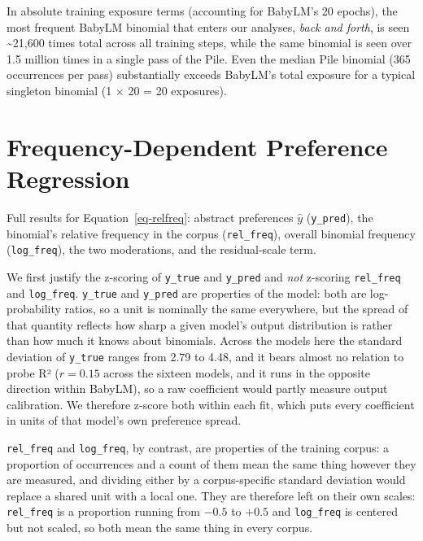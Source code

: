 \documentclass[11pt]{article}
\begin{document}
In absolute training exposure terms (accounting for BabyLM's 20 epochs),
the most frequent BabyLM binomial that enters our analyses, \emph{back
and forth}, is seen \textasciitilde21,600 times total across all
training steps, while the same binomial is seen over 1.5 million times
in a single pass of the Pile. Even the median Pile binomial (365
occurrences per pass) substantially exceeds BabyLM's total exposure for
a typical singleton binomial (1 × 20 = 20 exposures).

\newpage

\section{Frequency-Dependent Preference
Regression}\label{sec-appendix-relfreq}

Full results for Equation~\ref{eq-relfreq}: abstract preferences
\(\hat{y}\) (\texttt{y\_pred}), the binomial's relative frequency in the
corpus (\texttt{rel\_freq}), overall binomial frequency
(\texttt{log\_freq}), the two moderations, and the residual-scale term.

We first justify the z-scoring of \texttt{y\_true} and \texttt{y\_pred}
and \emph{not} z-scoring \texttt{rel\_freq} and \texttt{log\_freq}.
\texttt{y\_true} and \texttt{y\_pred} are properties of the model: both
are log-probability ratios, so a unit is nominally the same everywhere,
but the spread of that quantity reflects how sharp a given model's
output distribution is rather than how much it knows about binomials.
Across the models here the standard deviation of \texttt{y\_true} ranges
from 2.79 to 4.48, and it bears almost no relation to probe R²
(\(r = 0.15\) across the sixteen models, and it runs in the opposite
direction within BabyLM), so a raw coefficient would partly measure
output calibration. We therefore z-score both within each fit, which
puts every coefficient in units of that model's own preference spread.

\texttt{rel\_freq} and \texttt{log\_freq}, by contrast, are properties
of the training corpus: a proportion of occurrences and a count of them
mean the same thing however they are measured, and dividing either by a
corpus-specific standard deviation would replace a shared unit with a
local one. They are therefore left on their own scales:
\texttt{rel\_freq} is a proportion running from \(-0.5\) to \(+0.5\) and
\texttt{log\_freq} is centered but not scaled, so both mean the same
thing in every corpus.

\begingroup\fontsize{7}{9}\selectfont
\end{document}
